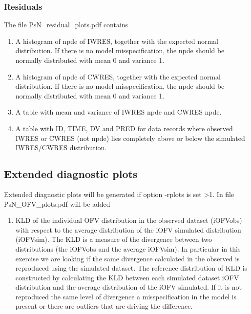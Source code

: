 \subsubsection{Residuals}
\noindent The file PsN\_residual\_plots.pdf contains
\begin{enumerate}
\item A histogram of npde of IWRES, together with the expected
normal distribution. If there is no model misspecification, the npde should
be normally distributed with mean 0 and variance 1.
\item A histogram of npde of CWRES, together with the expected
normal distribution. If there is no model misspecification, the npde should
be normally distributed with mean 0 and variance 1.
\item A table with mean and variance of IWRES npde and CWRES npde.
\item A table with ID, TIME, DV and PRED for data records where observed IWRES or CWRES (not npde)
lies completely above or below the simulated IWRES/CWRES distribution.
\end{enumerate}


\subsection{Extended diagnostic plots}
Extended diagnostic plots will be generated
if option -rplots is set >1.
In file PsN\_OFV\_plots.pdf will be added
\begin{enumerate}
\item KLD of the individual OFV distribution in the observed dataset (iOFVobs) with respect to the average distribution of the iOFV simulated distribution (iOFVsim). The KLD is a measure of the divergence between two distributions (the iOFVobs and the average iOFVsim). In particular in this exercise we are looking if the same divergence calculated in the observed is reproduced using the simulated dataset. The reference distribution of KLD is constructed by calculating the KLD between each simulated dataset iOFV distribution and the average distribution of the iOFV simulated. If it is not reproduced the same level of divergence a misspecification in the model is present or there are outliers that are driving the difference. 

\end{enumerate}



